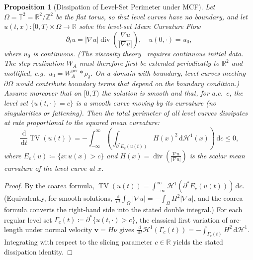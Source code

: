 \documentclass[11pt,a4paper,reqno]{amsart}
\newtheorem{proposition}[theorem]{Proposition}
\theoremstyle{definition}
\numberwithin{equation}{section}
\providecommand{\R}{\mathbb{R}}
\newcommand{\Z}{\mathbb{Z}}
\newcommand{\Tor}{\mathbb{T}}
\providecommand{\TV}{\operatorname{TV}}
\newcommand{\dif}{\,\mathrm{d}}
\providecommand{\R}{\mathbb{R}}
\providecommand{\TV}{\mathrm{TV}}
\begin{document}
\begin{proposition}[Dissipation of Level-Set Perimeter under MCF]
\label{thm:mean_curvature_coarea}
Let $\Omega = \Tor^2 = \R^2/\Z^2$ be the flat torus, so that level curves have no boundary, and let $u(t, x) \colon [0, T) \times \Omega \to \R$ solve the level-set Mean Curvature Flow
\begin{equation}
    \label{eq:mcf_pde}
    \partial_t u = |\nabla u| \operatorname{div}\left( \frac{\nabla u}{|\nabla u|} \right), \quad u(0, \cdot) = u_0,
\end{equation}
where $u_0$ is continuous. (The viscosity theory~\cite{evans1991mcf, chen1991uniqueness} requires continuous initial data. The step realization $W_A$ must therefore first be extended periodically to $\R^2$ and mollified, e.g.\ $u_0 = W_A^{\mathrm{per}} * \rho_\delta$. On a domain with boundary, level curves meeting $\partial\Omega$ would contribute boundary terms that depend on the boundary condition.) Assume moreover that on $[0,T)$ the solution is smooth and that, for a.e.\ $c$, the level set $\{u(t,\cdot) = c\}$ is a smooth curve moving by its curvature (no singularities or fattening). Then the total perimeter of all level curves dissipates at rate proportional to the squared mean curvature:
\begin{equation}
    \frac{\dif}{\dif t} \TV(u(t)) = -\int_{-\infty}^\infty \left( \int_{\partial^* E_c(u(t))} H(x)^2 \dif \mathcal{H}^1(x) \right) \dif c \le 0,
\end{equation}
where $E_c(u) \coloneqq \{x \colon u(x) > c\}$ and $H(x) = \operatorname{div}(\frac{\nabla u}{|\nabla u|})$ is the scalar mean curvature of the level curve at $x$.
\end{proposition}
\begin{proof}
By the coarea formula, $\TV(u(t)) = \int_{-\infty}^\infty \mathcal{H}^1(\partial^* E_c(u(t))) \dif c$. (Equivalently, for smooth solutions, $\frac{\dif}{\dif t}\int_\Omega |\nabla u| = -\int_\Omega H^2 |\nabla u|$, and the coarea formula converts the right-hand side into the stated double integral.) For each regular level set $\Gamma_c(t) \coloneqq \partial^* \{u(t, \cdot) > c\}$, the classical first variation of arc-length under normal velocity $\mathbf{v} = H \nu$ gives $\frac{\dif}{\dif t} \mathcal{H}^1(\Gamma_c(t)) = -\int_{\Gamma_c(t)} H^2 \dif \mathcal{H}^1$. Integrating with respect to the slicing parameter $c \in \R$ yields the stated dissipation identity.
\end{proof}

\end{document}
